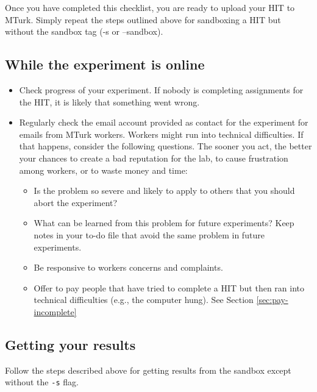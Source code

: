 \documentclass{article}
\begin{document}
Once you have completed this checklist, you are ready to upload your HIT to MTurk. Simply repeat the steps outlined above for sandboxing a HIT but without the sandbox tag (-s or --sandbox).



\subsection{While the experiment is online}
\begin{tcolorbox}[colback=gray!5,colframe=blue!40!black,title=Monitoring while the experiment is in progress]
\begin{itemize}
    \item Check progress of your experiment. If nobody is completing assignments for the HIT, it is likely that something went wrong. %
    \item Regularly check the email account provided as contact for the experiment for emails from MTurk workers. Workers might run into technical difficulties. If that happens, consider the following questions. The sooner you act, the better your chances to create a bad reputation for the lab, to cause frustration among workers, or to waste money and time:
    \begin{itemize}
    	\item Is the problem so severe and likely to apply to others that you should abort the experiment? 
	\item What can be learned from this problem for future experiments? Keep notes in your to-do file that avoid the same problem in future experiments. 
	\item Be responsive to workers concerns and complaints. 
	\item Offer to pay people that have tried to complete a HIT but then ran into technical difficulties (e.g., the computer hung). See Section \ref{sec:pay-incomplete}
   \end{itemize}
\end{itemize}
\end{tcolorbox}
   

\subsection{Getting your results}
Follow the steps described above for getting results from the sandbox except without the \texttt{-s} flag.
\end{document}
